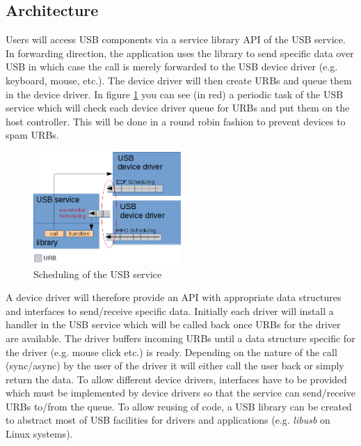 \documentclass{acm_proc_article-sp}
\begin{document}
\subsection{Architecture}
Users will access USB components via a service library API of the USB service.
In forwarding direction, the application uses the library to send specific data
over USB in which case the call is merely forwarded to the USB device driver
(e.g. keyboard, mouse, etc.).
The device driver will then create URBs and queue them in the device driver.
In figure \ref{fig:usbsched} you can see (in red) a periodic task of the USB service
which will check each device driver queue for URBs and put them on the host controller.
This will be done in a round robin fashion to prevent devices to spam URBs.
\begin{figure}[!h]
\centering
\includegraphics[width=0.5\textwidth]{usbsched.png}
\caption{Scheduling of the USB service}
\label{fig:usbsched}
\end{figure}
A device driver will therefore provide an API with appropriate data structures
and interfaces to send/receive specific data.
Initially each driver will install a handler in the USB service which will be
called back once URBs for the driver are available.
The driver buffers incoming URBs until a data structure specific for the driver
(e.g. mouse click etc.) is ready.
Depending on the nature of the call (sync/async) by the user of the driver it will
either call the user back or simply return the data.
To allow different device drivers, interfaces have to be provided which must be implemented
by device drivers so that the service can send/receive URBs to/from the queue.
To allow reusing of code, a USB library can be created to abstract
most of USB facilities for drivers and applications (e.g. \emph{libusb} on Linux systems).
\end{document}

